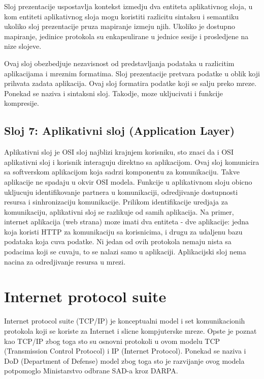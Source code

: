 \documentclass[a4paper,12pt, master]{etf}
\begin{document}
	Sloj prezentacije uspostavlja kontekst izmedju dva entiteta aplikativnog sloja, u kom 
	entiteti aplikativnog sloja mogu koristiti razlicitu sintaksu i semantiku ukoliko sloj 
	prezentacije pruza mapiranje izmeju njih. Ukoliko je dostupno mapiranje, jedinice 
	protokola su enkapsulirane u jednice sesije i prosledjene na nize slojeve.

	Ovaj sloj obezbedjuje nezavisnost od predstavljanja podataka u razlicitim aplikacijama i
	mreznim formatima. Sloj prezentacije pretvara podatke u oblik koji prihvata zadata 
	aplikacija.	Ovaj sloj formatira podatke koji se salju preko mreze. Ponekad se naziva i 
	sintaksni sloj.	Takodje, moze ukljucivati i funkcije kompresije.

	\subsection{Sloj 7: Aplikativni sloj (Application Layer)}

	Aplikativni sloj je OSI sloj najblizi krajnjem korisniku, sto znaci da i OSI aplikativni 
	sloj i korisnik interaguju direktno sa aplikacijom. Ovaj sloj komunicira sa softverskom 
	aplikacijom	koja sadrzi komponentu za komunikaciju. Takve aplikacije ne spadaju u okvir 
	OSI modela.	Funkcije u aplikativnom sloju obicno ukljucuju identifikovanje partnera u 
	komunikaciji, odredjivanje dostupnosti resursa i sinhronizaciju komunikacije. Prilikom 
	identifikacije uredjaja za komunikaciju, aplikativni sloj se razlikuje od samih 
	aplikacija. Na primer, internet aplikacija (web strana) moze imati dva entiteta - dve 
	aplikacije: jedna koja koristi HTTP za komunikaciju sa korisnicima, i drugu za udaljenu 
	bazu podataka koja cuva podatke. Ni jedan od ovih protokola nemaju nista sa podacima koji 
	se cuvaju, to se nalazi samo u aplikaciji. Aplikacijski sloj nema nacina za odredjivanje 
	resursa u mrezi.

	\section{Internet protocol suite}
	
	Internet protocol suite (TCP/IP) je konceptualni model i set komunikacionih protokola koji se 
	koriste za Internet i slicne kompjuterske mreze. Opste je poznat kao TCP/IP zbog toga sto 
	su osnovni protokoli u ovom modelu TCP (Transmission Control Protocol) i IP (Internet 
	Protocol). Ponekad se naziva i DoD (Department of Defense) model zbog toga sto je 
	razvijanje ovog modela potpomoglo Ministarstvo odbrane SAD-a kroz DARPA.
\end{document}
